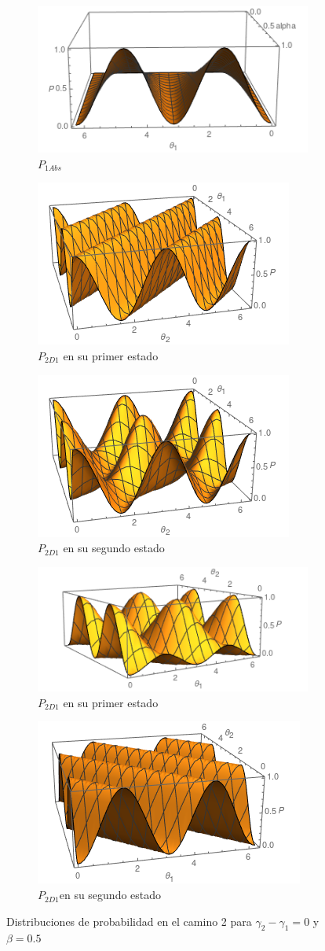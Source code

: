 \documentclass[11pt]{article}
\begin{document}
\begin{figure}[h!]
\centering
\begin{subfigure}[b]{0.40\linewidth}
\includegraphics[width=\linewidth,height=3.5 cm]{pcabs.png}
\caption{$P_{1Abs}$}
\label{fig:BS1}
\end{subfigure}
\begin{subfigure}[b]{0.40\linewidth}
\includegraphics[width=\linewidth,height=3.5 cm]{pcd21.png}
\caption{$P_{2D1}$ en su primer estado }
\label{fig:BS1}
\end{subfigure}
\begin{subfigure}[b]{0.40\linewidth}
\includegraphics[width=\linewidth,height=3.5 cm]{pcd22.png}
\caption{$P_{2D1}$ en su segundo estado}
\label{fig:BS1}
\end{subfigure}
\begin{subfigure}[b]{0.40\linewidth}
\includegraphics[width=\linewidth,height=3.5 cm]{pcd11.png}
\caption{$P_{2D1} $ en su primer estado}
\label{fig:westminster_aerea}
\end{subfigure}
\begin{subfigure}[b]{0.40\linewidth}
\includegraphics[width=\linewidth,height=3.5 cm]{pcd12.png}
\caption{$P_{2D1} $en su segundo estado }
\label{fig:BS1}
\end{subfigure}
\caption{Distribuciones de probabilidad en el camino 2 para  $\gamma_{2}-\gamma_{1}=0 $ y $\beta=0.5$}
\label{fig:westminster}
\end{figure}
\end{document}
